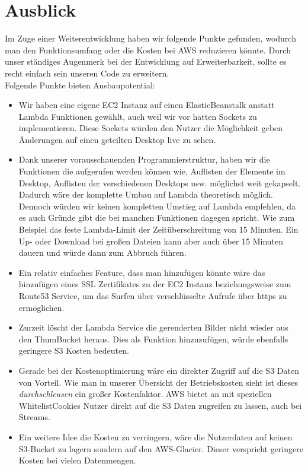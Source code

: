 \documentclass[a4paper, 12pt]{scrreprt}
\renewcommand\_{\textunderscore\allowbreak}
\begin{document}
   

\chapter{Ausblick}
Im Zuge einer Weiterentwicklung haben wir folgende Punkte gefunden, wodurch man den Funktionsumfang oder die Kosten bei AWS reduzieren könnte. Durch unser ständiges Augenmerk bei der Entwicklung auf Erweiterbarkeit, sollte es recht einfach sein unseren Code zu erweitern. \\
Folgende Punkte bieten Ausbaupotential:
\begin{itemize}
\item Wir haben eine eigene EC2 Instanz auf einen ElasticBeanstalk anstatt Lambda Funktionen gewählt, auch weil wir vor hatten Sockets zu implementieren. Diese Sockets würden den Nutzer die Möglichkeit geben Änderungen auf einen geteilten Desktop live zu sehen. 
\item Dank unserer vorausschauenden Programmierstruktur, haben wir die Funktionen die aufgerufen werden können wie, Auflisten der Elemente im Desktop, Auflisten der verschiedenen Desktops usw. möglichst weit gekapselt. Dadurch wäre der komplette Umbau auf Lambda theoretisch möglich. Dennoch würden wir keinen kompletten Umstieg auf Lambda empfehlen, da es auch Gründe gibt die bei manchen Funktionen dagegen spricht. Wie zum Beispiel das feste Lambda-Limit der Zeitüberschreitung von 15 Minuten. Ein Up- oder Download bei großen Dateien kann aber auch über 15 Minuten dauern und würde dann zum Abbruch führen.
\item Ein relativ einfaches Feature, dass man hinzufügen könnte wäre das hinzufügen eines SSL Zertifikates zu der EC2 Instanz beziehungsweise zum Route53 Service, um das Surfen über verschlüsselte Aufrufe über https zu ermöglichen.
\item Zurzeit löscht der Lambda Service die gerenderten Bilder nicht wieder aus den ThumBucket heraus. Dies als Funktion hinzuzufügen, würde ebenfalls geringere S3 Kosten bedeuten.
\item Gerade bei der Kostenoptimierung wäre ein direkter Zugriff auf die S3 Daten von Vorteil. Wie man in unserer Übersicht der Betriebskosten sieht ist dieses \emph{durchschleusen} ein großer Kostenfaktor. AWS bietet an mit speziellen \glqq Whitelist\grqq  Cookies Nutzer direkt auf die S3 Daten zugreifen zu lassen, auch bei Streams.
\item Ein weitere Idee die Kosten zu verringern, wäre die Nutzerdaten auf keinen S3-Bucket zu lagern sondern auf den AWS-Glacier. Dieser verspricht geringere Kosten bei vielen Datenmengen.

\end{itemize}
\end{document}
